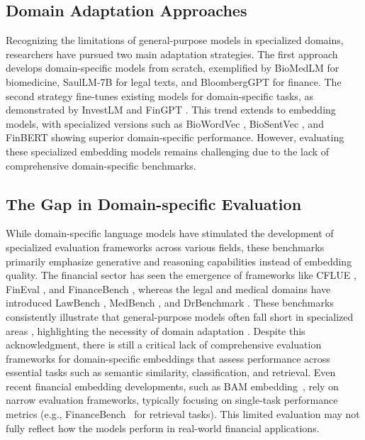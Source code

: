 \subsection{Domain Adaptation Approaches}
Recognizing the limitations of general-purpose models in specialized domains, researchers have pursued two main adaptation strategies. The first approach develops domain-specific models from scratch, exemplified by BioMedLM \citep{biomedlm} for biomedicine, SaulLM-7B \citep{saullm} for legal texts, and BloombergGPT \citep{bloomberggpt} for finance. The second strategy fine-tunes existing models for domain-specific tasks, as demonstrated by InvestLM \citep{investlm} and FinGPT \citep{fingpt}. This trend extends to embedding models, with specialized versions such as BioWordVec \citep{biowordvec}, BioSentVec \citep{biosentvec}, and FinBERT \citep{finbert} showing superior domain-specific performance. However, evaluating these specialized embedding models remains challenging due to the lack of comprehensive domain-specific benchmarks.


\subsection{The Gap in Domain-specific Evaluation}
While domain-specific language models have stimulated the development of specialized evaluation frameworks across various fields, these benchmarks primarily emphasize generative and reasoning capabilities instead of embedding quality. The financial sector has seen the emergence of frameworks like CFLUE \citep{CFLUE}, FinEval \citep{fineval}, and FinanceBench \citep{financebench}, whereas the legal and medical domains have introduced LawBench \citep{lawbench}, MedBench \citep{medbench}, and DrBenchmark \citep{drbenchmark}. These benchmarks consistently illustrate that general-purpose models often fall short in specialized areas \citep{CFLUE, lawbench}, highlighting the necessity of domain adaptation \citep{domainiskey}. Despite this acknowledgment, there is still a critical lack of comprehensive evaluation frameworks for domain-specific embeddings that assess performance across essential tasks such as semantic similarity, classification, and retrieval. Even recent financial embedding developments, such as BAM embedding~\citep{anderson-etal-2024-finance_text_embedding}, rely on narrow evaluation frameworks, typically focusing on single-task performance metrics (e.g., FinanceBench~\citep{financebench} for retrieval tasks). 
This limited evaluation may not fully reflect how the models perform in real-world financial applications.



